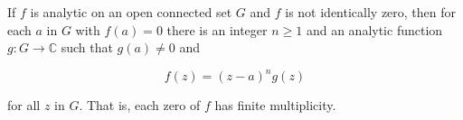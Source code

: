 If $f$ is analytic on an open connected set $G$ and $f$ is not identically zero, then for each $a$ in $G$ with $f(a) = 0$ there is an integer $n \geq 1$ and an analytic function $g: G \to \mathbb{C}$ such that $g(a) \neq 0$ and

$$f(z) = (z-a)^n g(z)$$

for all $z$ in $G$. That is, each zero of $f$ has finite multiplicity.
